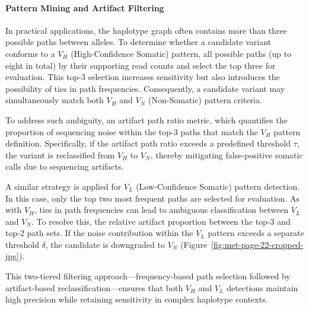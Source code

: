 \documentclass[pdflatex,sn-nature]{sn-jnl}
\begin{document}
\paragraph{Pattern Mining and Artifact Filtering}\label{pattern-mining-and-artifact-filtering}

In practical applications, the haplotype graph often contains more than three possible paths between alleles. To determine whether a candidate variant conforms to a $V_H$ (High-Confidence Somatic) pattern, all possible paths (up to eight in total) by their supporting read counts and select the top three for evaluation. This top-3 selection increases sensitivity but also introduces the possibility of ties in path frequencies. Consequently, a candidate variant may simultaneously match both $V_H$ and $V_N$ (Non-Somatic) pattern criteria.

To address such ambiguity, an artifact path ratio metric, which quantifies the proportion of sequencing noise within the top-3 paths that match the $V_H$ pattern definition. Specifically, if the artifact path ratio exceeds a predefined threshold $\tau$, the variant is reclassified from $V_H$ to $V_N$, thereby mitigating false-positive somatic calls due to sequencing artifacts.

A similar strategy is applied for $V_L$ (Low-Confidence Somatic) pattern detection. In this case, only the top two most frequent paths are selected for evaluation. As with $V_H$, ties in path frequencies can lead to ambiguous classification between $V_L$ and $V_N$. To resolve this, the relative artifact proportion between the top-3 and top-2 path sets. If the noise contribution within the $V_L$ pattern exceeds a separate threshold $\delta$, the candidate is downgraded to $V_N$ (Figure~\ref{fig:met-page-22-cropped-jpg}).

This two-tiered filtering approach—frequency-based path selection followed by artifact-based reclassification—ensures that both $V_H$ and $V_L$ detections maintain high precision while retaining sensitivity in complex haplotype contexts.
\end{document}
